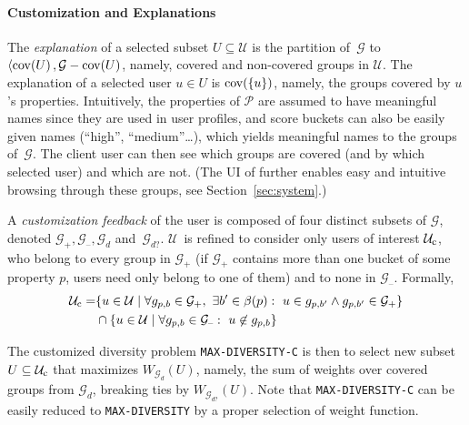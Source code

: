 
\paragraph*{Customization and Explanations}
The \emph{explanation} of a selected subset $U\subseteq\mathcal{U}$ is the partition of~$\mathcal{G}$ to $\langle \operatorname{cov}\!\left({U}\right), \mathcal{G}-\operatorname{cov}\!\left({U}\right)$, namely, covered and non-covered groups in $\mathcal{U}$. The explanation of a selected user $u\in U$ is $\operatorname{cov}\!\left({\{u\}}\right)$, namely, the groups covered by $u$'s properties. Intuitively, the properties of $\mathcal{P}$ are assumed to have meaningful names since they are used in user profiles, and score buckets can also be easily given names (``high'', ``medium''\dots), which yields meaningful names to  the groups of~$\mathcal{G}$. The client user can then see which groups are covered (and by which selected user) and which are not. (The UI of \sysname{} further enables easy and intuitive browsing through these groups, see Section~\ref{sec:system}.)

A \emph{customization feedback} of the user is composed of four distinct subsets of $\mathcal{G}$, denoted $\mathcal{G}_{+},\mathcal{G}_{\textrm{--}},\mathcal{G}_{d}$ and~$\mathcal{G}_{d?}$. $\mathcal{U}$~is refined to consider only users of interest $\mathcal{U}_{\operatorname{c}}$, who belong to every group in  $\mathcal{G}_{+}$ (if $\mathcal{G}_{+}$ contains more than one bucket of some property $p$, users need only belong to one of them) and to none in $\mathcal{G}_{\textrm{--}}$. Formally,
\[\begin{split}
\mathcal{U}_{\operatorname{c}} = & \{u\in\mathcal{U}\mid\forall g_{p,b}\in \mathcal{G}_{+}, ~\exists b'\in \beta(p): ~u\in g_{p,b'} \wedge g_{p,b'} \in\mathcal{G}_{+}\} \\
& \cap  \{u\in\mathcal{U}\mid\forall g_{p,b}\in \mathcal{G}_{\textrm{--}} : ~u\not\in g_{p,b}\}
\end{split}\]

The customized diversity problem  \texttt{MAX-DIVERSITY-C} is then to select new subset $U\subseteq\mathcal{U}_{\operatorname{c}}$ that maximizes $W_{\mathcal{G}_{d}}(U)$, namely, the sum of weights over covered groups from  $\mathcal{G}_{d}$, breaking ties by $W_{\mathcal{G}_{d?}}(U)$. Note that \texttt{MAX-DIVERSITY-C} can be easily reduced to \texttt{MAX-DIVERSITY} by a proper selection of weight function.

